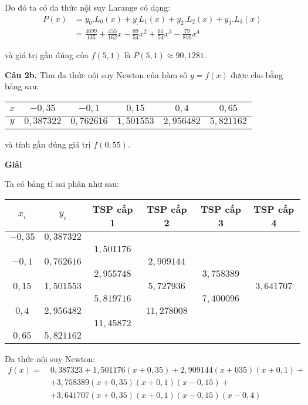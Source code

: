 Do đó ta có đa thức nội suy Larange có dạng:
\begin{align*}
	P(x)	& =y_0.L_0(x)+y_.L_1(x)+y_2.L_2(x)+y_3.L_3(x)\\
			& =\frac{4699}{135} + \frac{455}{162}x - \frac{89}{54}x^2 + \frac{61}{54}x^3 - \frac{79}{810}x^4
\end{align*}

và giá trị gần đúng của $f(5,1)$ là $P(5,1)\approx 90,1281$.

\textbf{Câu 2b.} Tìm đa thức nội suy Newton của hàm số $y=f(x)$ được cho bằng bảng sau:\par
\begin{longtable}{|c|c|c|c|c|c|}\hline
	$x$ & $-0,35$ & $-0,1$ & $0,15$ & $0,4$ & $0,65$\\ \hline
	$y$ & $0,387322$ & $0,762616$ & $1,501553$ & $2,956482$ & $5,821162$\\ \hline
\end{longtable}
và tính gần đúng giá trị $f\left(0,55\right)$.\par

\textbf{Giải}\par

Ta có bảng tỉ sai phân như sau:
\begin{longtable}{|c|c|c|c|c|c|}\hline
	$x_i$ & $y_i$ & TSP cấp 1 & TSP cấp 2 & TSP cấp 3 & TSP cấp 4\\ \hline
	\endhead
	$-0,35$ & $0,387322$ &&&& \\ \hline
	&&$1,501176$&&& \\ \hline
	$-0,1$ & $0,762616$&&$2,909144$&& \\ \hline
	&&$2,955748$&&$3,758389$&\\ \hline
	$0,15$&$1,501553$&&$5,727936$&&$3,641707$\\ \hline
	&&$5,819716$&&$7,400096$& \\ \hline
	$0,4$&$2,956482$&&$11,278008$&& \\ \hline
	&&$11,45872$&&& \\ \hline
	$0,65$&$5,821162$&&&& \\ \hline
\end{longtable}

Đa thức nội suy Newton:
\begin{align*}
	f(x) =~& 0,387323 + 1,501176(x+0,35) + 2,909144(x+035)(x+0,1) +\\
	&+ 3,758389(x+0,35)(x+0,1)(x-0,15) +\\
	&+ 3,641707(x+0,35)(x+0,1)(x-0,15)(x-0,4)
\end{align*}

